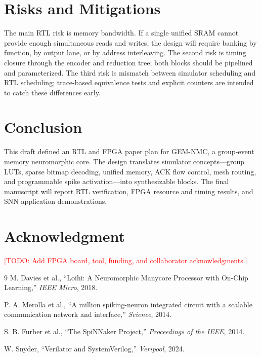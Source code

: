 \documentclass[10pt,conference]{IEEEtran}
\newcommand{\arch}{GEM-NMC}
\newcommand{\todo}[1]{\textcolor{red}{[TODO: #1]}}
\begin{document}
\section{Risks and Mitigations}
The main RTL risk is memory bandwidth. If a single unified SRAM cannot provide enough simultaneous reads and writes, the design will require banking by function, by output lane, or by address interleaving. The second risk is timing closure through the encoder and reduction tree; both blocks should be pipelined and parameterized. The third risk is mismatch between simulator scheduling and RTL scheduling; trace-based equivalence tests and explicit counters are intended to catch these differences early.

\section{Conclusion}
This draft defined an RTL and FPGA paper plan for \arch{}, a group-event memory neuromorphic core. The design translates simulator concepts---group LUTs, sparse bitmap decoding, unified memory, ACK flow control, mesh routing, and programmable spike activation---into synthesizable blocks. The final manuscript will report RTL verification, FPGA resource and timing results, and SNN application demonstrations.

\section*{Acknowledgment}
\todo{Add FPGA board, tool, funding, and collaborator acknowledgments.}

\begin{thebibliography}{9}
M. Davies et al., ``Loihi: A Neuromorphic Manycore Processor with On-Chip Learning,'' \emph{IEEE Micro}, 2018.

P. A. Merolla et al., ``A million spiking-neuron integrated circuit with a scalable communication network and interface,'' \emph{Science}, 2014.

S. B. Furber et al., ``The SpiNNaker Project,'' \emph{Proceedings of the IEEE}, 2014.

W. Snyder, ``Verilator and SystemVerilog,'' \emph{Veripool}, 2024.
\end{thebibliography}
\end{document}
